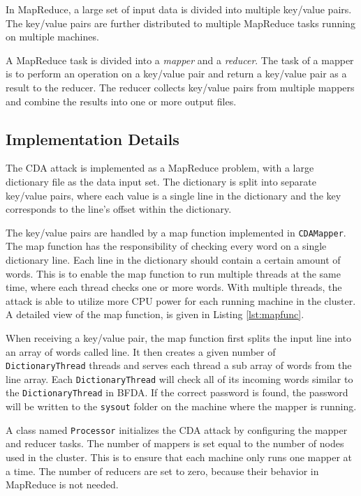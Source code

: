 \documentclass[pdftex,english,10pt,b5paper,twoside]{book}
\begin{document}
In MapReduce, a large set of input data is divided into multiple key/value
pairs. The key/value pairs are further distributed to multiple MapReduce tasks
running on multiple machines.

A MapReduce task is divided into a \emph{mapper} and a \emph{reducer}. The task
of a mapper is to perform an operation on a key/value pair and return a
key/value pair as a result to the reducer. The reducer collects key/value pairs
from multiple mappers and combine the results into one or more output files.

\subsection{Implementation Details}

The \ac{CDA} attack is implemented as a MapReduce problem, with a large
dictionary file as the data input set. The dictionary is split into separate
key/value pairs, where each value is a single line in the dictionary and the
key corresponds to the line's offset within the dictionary.

The key/value pairs are handled by a map function implemented in
\texttt{CDAMapper}. The
map function has the responsibility of checking every word on a single
dictionary line. Each line in the dictionary should contain a certain amount of
words. This is to enable the map function to run multiple threads at the same
time, where each thread checks one or more words. With multiple threads, the
attack is able to utilize more \ac{CPU} power for each running machine in the
cluster. A detailed view of the map function, is given in Listing
\ref{lst:mapfunc}.



When receiving a key/value pair, the map function first splits the input line
into an array of words called line. It then creates a given number of
\texttt{DictionaryThread} threads and serves each thread a sub array of words from the
line array. Each \texttt{DictionaryThread} will check all of its incoming words similar
to the \texttt{DictionaryThread} in BFDA. If the correct password is found, the
password will be written to the \texttt{sysout} folder on the machine where the mapper is
running.

A class named \texttt{Processor} initializes the \ac{CDA} attack by configuring
the mapper and reducer tasks. The number of mappers is set equal to the number
of nodes used in the cluster. This is to ensure that each machine only runs one
mapper at a time. The number of reducers are set to zero, because their
behavior in MapReduce is not needed.
\end{document}
